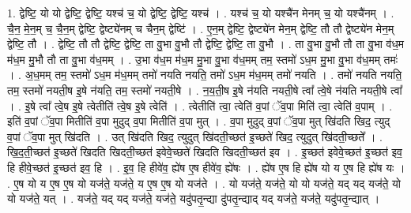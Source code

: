 \documentclass[17pt]{extarticle}
\begin{document}
1. द्वेष्टि॒ यो यो द्वेष्टि॒ द्वेष्टि॒ यश्च॑ च॒ यो द्वेष्टि॒ द्वेष्टि॒ यश्च॑ । . यश्च॑ च॒ यो यश्चै॑न मेनम् च॒ यो यश्चै॑नम् । . चै॒न॒ मे॒न॒म् च॒ चै॒न॒म् द्वेष्टि॒ द्वेष्ट्ये॑नम् च चैन॒म् द्वेष्टि॑ । . ए॒न॒म् द्वेष्टि॒ द्वेष्ट्ये॑न मेन॒म् द्वेष्टि॒ तौ तौ द्वेष्ट्ये॑न मेन॒म् द्वेष्टि॒ तौ । . द्वेष्टि॒ तौ तौ द्वेष्टि॒ द्वेष्टि॒ ता वु॒भा वु॒भौ तौ द्वेष्टि॒ द्वेष्टि॒ ता वु॒भौ । . ता वु॒भा वु॒भौ तौ ता वु॒भा व॑ध॒म म॑ध॒म मु॒भौ तौ ता वु॒भा व॑ध॒मम् । . उ॒भा व॑ध॒म म॑ध॒म मु॒भा वु॒भा व॑ध॒मम् तम॒ स्तमो॑ ऽध॒म मु॒भा वु॒भा व॑ध॒मम् तमः॑ । . अ॒ध॒मम् तम॒ स्तमो॑ ऽध॒म म॑ध॒मम् तमो॑ नयति नयति॒ तमो॑ ऽध॒म म॑ध॒मम् तमो॑ नयति । . तमो॑ नयति नयति॒ तम॒ स्तमो॑ नयती॒ष इ॒षे न॑यति॒ तम॒ स्तमो॑ नयती॒षे । . न॒य॒ती॒ष इ॒षे न॑यति नयती॒षे त्वा᳚ त्वे॒षे न॑यति नयती॒षे त्वा᳚ । . इ॒षे त्वा᳚ त्वे॒ष इ॒षे त्वेतीति॑ त्वे॒ष इ॒षे त्वेति॑ । . त्वेतीति॑ त्वा॒ त्वेति॑ व॒पां ॅव॒पा मिति॑ त्वा॒ त्वेति॑ व॒पाम् । . इति॑ व॒पां ॅव॒पा मितीति॑ व॒पा मुदुद् व॒पा मितीति॑ व॒पा मुत् । . व॒पा मुदुद् व॒पां ॅव॒पा मुत् खि॑दति खिद॒ त्युद् व॒पां ॅव॒पा मुत् खि॑दति । . उत् खि॑दति खिद॒ त्युदुत् खि॑दती॒च्छत॑ इ॒च्छते॑ खिद॒ त्युदुत् खि॑दती॒च्छते᳚ । . खि॒द॒ती॒च्छत॑ इ॒च्छते॑ खिदति खिदती॒च्छत॑ इवेवे॒च्छते॑ खिदति खिदती॒च्छत॑ इव । . इ॒च्छत॑ इवेवे॒च्छत॑ इ॒च्छत॑ इव॒ हि हीवे॒च्छत॑ इ॒च्छत॑ इव॒ हि । . इ॒व॒ हि हीवे॑व॒ ह्ये॑ष ए॒ष हीवे॑व॒ ह्ये॑षः । . ह्ये॑ष ए॒ष हि ह्ये॑ष यो य ए॒ष हि ह्ये॑ष यः । . ए॒ष यो य ए॒ष ए॒ष यो यज॑ते॒ यज॑ते॒ य ए॒ष ए॒ष यो यज॑ते । . यो यज॑ते॒ यज॑ते॒ यो यो यज॑ते॒ यद् यद् यज॑ते॒ यो यो यज॑ते॒ यत् । . यज॑ते॒ यद् यद् यज॑ते॒ यज॑ते॒ यदु॑पतृ॒न्द्या दु॑पतृ॒न्द्याद् यद् यज॑ते॒ यज॑ते॒ यदु॑पतृ॒न्द्यात् । \newline
\end{document}
